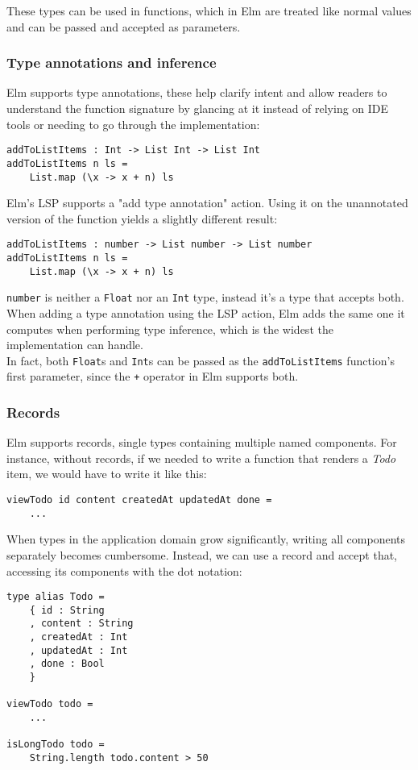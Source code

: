 These types can be used in functions, which in Elm are treated like normal values and can be passed and accepted as parameters.

\subsubsection{Type annotations and inference}
Elm supports type annotations, these help clarify intent and allow readers to understand the function signature by glancing at it instead of relying on IDE tools or needing to go through the implementation:
\begin{verbatim}
addToListItems : Int -> List Int -> List Int
addToListItems n ls =
    List.map (\x -> x + n) ls
\end{verbatim}

Elm's LSP supports a "add type annotation" action. Using it on the unannotated version of the function yields a slightly different result:
\begin{verbatim}
addToListItems : number -> List number -> List number
addToListItems n ls =
    List.map (\x -> x + n) ls
\end{verbatim}
\texttt{number} is neither a \texttt{Float} nor an \texttt{Int} type, instead it's a type that accepts both. When adding a type annotation using the LSP action, Elm adds the same one it computes when performing type inference, which is the widest the implementation can handle.\\
In fact, both \texttt{Float}s and \texttt{Int}s can be passed as the \texttt{addToListItems} function's first parameter, since the \texttt{+} operator in Elm supports both.

\subsubsection{Records}
Elm supports records, single types containing multiple named components. For instance, without records, if we needed to write a function that renders a \textit{Todo} item, we would have to write it like this:
\begin{verbatim}
viewTodo id content createdAt updatedAt done =
    ...
\end{verbatim}
When types in the application domain grow significantly, writing all components separately becomes cumbersome. Instead, we can use a record and accept that, accessing its components with the dot notation:
\begin{verbatim}
type alias Todo =
    { id : String
    , content : String
    , createdAt : Int
    , updatedAt : Int
    , done : Bool
    }

viewTodo todo =
    ...

isLongTodo todo =
    String.length todo.content > 50
\end{verbatim}

